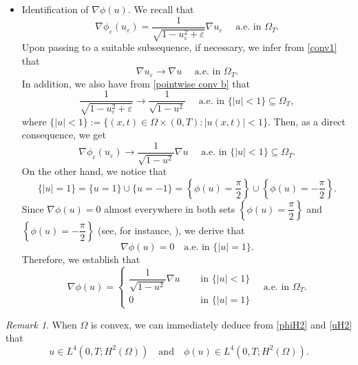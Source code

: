 \documentclass[11pt,  reqno]{amsart}%
\theoremstyle{plain}
\theoremstyle{definition}
\theoremstyle{remark}
\newtheorem{remark}[theorem]{Remark}
\numberwithin{equation}{section}
\newcommand{\ve}{\varepsilon}
\begin{document}
\begin{itemize}
    \item Identification of $\nabla \phi(u)$. We recall that
    $$
    \nabla \phi_\ve(u_\ve)= \dfrac{1}{\sqrt{1-u^2_\ve +\ve}} \nabla u_\ve \quad \textrm{ a.e. in }\Omega_T.
    $$
  Upon passing to a suitable subsequence, if necessary, we infer from \eqref{conv1} that
  \begin{equation}
        \label{pointwise convergence of nablau}
        \nabla u_\ve \to \nabla u \quad \textrm{ a.e. in }\Omega_T.
    \end{equation}
    In addition, we also have from \eqref{pointwise conv b} that
    \begin{equation}
    \dfrac{1}{\sqrt{1-u^2_\ve +\ve}} \to 
      \dfrac{1}{\sqrt{1-u^2}}
    \quad \textrm{ a.e. in } \{ |u|< 1 \} \subseteq \Omega_T,
    \end{equation}
    where $\{ |u|< 1 \}:= \{ (x,t) \in \Omega \times (0,T) :  |u(x,t)| < 1  \}.$
    Then, as a direct consequence, we get
    $$
     \nabla \phi_\ve(u_\ve) \to  \dfrac{1}{\sqrt{1-u^2}} \nabla u \quad \textrm{ a.e. in } \{ |u|< 1 \} \subseteq \Omega_T.
    $$
    On the other hand, we notice that
    $$
    \{  |u| = 1 \} = \{ u= 1 \} \cup \{ u = -1 \} = \left\{ \phi(u) = \dfrac{\pi}{2} \right\} \cup  \left\{ \phi(u) = -\dfrac{\pi}{2} \right\}.
    $$
 Since $\nabla \phi(u)=0$ almost everywhere in both sets $\left\{ \phi(u) = \dfrac{\pi}{2} \right\}$ and $\left\{ \phi(u) = - \dfrac{\pi}{2} \right\} $ (see, for instance, \cite{EPDE1998}), we derive that
    $$
    \nabla \phi(u)=0 \quad \text{a.e. in } \{  |u| = 1 \} .
    $$
    Therefore, we establish that 
    \begin{equation}
    \label{nabla phiu- ae}
    \nabla \phi(u)= 
    \begin{cases}
     \dfrac{1}{\sqrt{1-u^2}} \nabla u \quad &\text{ in } \{ |u|< 1 \}
     \\
     0 \quad &\text{ in } \{ |u|= 1 \}
    \end{cases}
    \quad \text{a.e. in  } \Omega_T.
    \end{equation}
	\end{itemize}
	
	\begin{remark}
	When $\Omega$ is convex, we can immediately deduce from \eqref{phiH2} and \eqref{uH2} that 
	$$          
 u\in L^4(0,T;H^2(\Omega))\quad \text{and} \quad \phi(u) \in L^4(0,T;H^2(\Omega)).
            $$  
	\end{remark}
    
\end{document}
